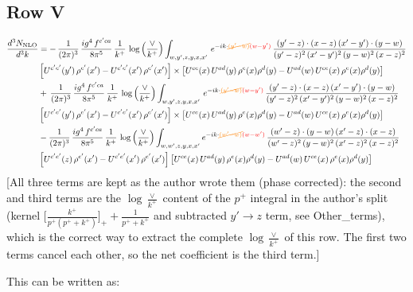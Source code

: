 \documentclass[9pt]{article}
\numberwithin{equation}{section}
\begin{document}
\subsection{Row V}
\begin{align}
    \frac{d^{3}N_{\rm NLO}}{d^{3}k} & =   -\,\frac{1}{(2\pi)^{3}}\, \frac{ig^{4}\,f^{c'ca}}{8\pi^{5}}\, \frac{1}{k^{+}}\,\log{\left(\frac{\vee}{k^{+}}\right)} \int_{w,y',z,y,x,x'}\, e^{-ik\cdot {\color{orange}\cancel{(y'-w)}}{\color{red}(w-y')}}\,\frac{(y'-z)\cdot (x-z)\,(x'-y')\cdot (y-w)}{(y'-z)^{2}\,(x'-y')^{2}\,(y-w)^{2}\,(x-z)^{2}}\notag \\ & \left[U^{c'e'}(y')\,\rho^{e'}(x')-U^{c'e'}(x')\,\rho^{e'}(x')\right]\times  \left[U^{ce}(x)\,U^{ad}(y)\,\rho^{e}(x)\rho^{d}(y)-U^{ad}(w)\,U^{ce}(x)\,\rho^{e}(x)\rho^{d}(y)\right] \notag \\
&   +\,\frac{1}{(2\pi)^{3}}\, \frac{ig^{4}\,f^{c'ca}}{8\pi^{5}}\, \frac{1}{k^{+}}\,\log{\left(\frac{\vee}{k^{+}}\right)} \int_{w,y',z,y,x,x'}\, e^{-ik\cdot {\color{orange}\cancel{(y'-w)}}{\color{red}(w-y')}}\,\frac{(y'-z)\cdot (x-z)\,(x'-y')\cdot (y-w)}{(y'-z)^{2}\,(x'-y')^{2}\,(y-w)^{2}\,(x-z)^{2}}\notag \\ &   \left[U^{c'e'}(y')\,\rho^{e'}(x')-U^{c'e'}(x')\,\rho^{e'}(x')\right]\times  \left[U^{ce}(x)\,U^{ad}(y)\,\rho^{e}(x)\rho^{d}(y)-U^{ad}(w)\,U^{ce}(x)\,\rho^{e}(x)\rho^{d}(y)\right] \notag \\
&   -\frac{1}{(2\pi)^{3}}\, \frac{ig^{4}\,f^{c'ca}}{8\pi^{5}}\, \frac{1}{k^{+}}\,\log{\left(\frac{\vee}{k^{+}}\right)}\int_{w,w',z,y,x,x'} e^{-ik\cdot {\color{orange}\cancel{(w'-w)}}{\color{red}(w-w')}}\,\frac{(w'-z)\cdot (y-w)\,(x'-z)\cdot (x-z)}{(w'-z)^{2}\,(y-w)^{2}\,(x'-z)^{2}\,(x-z)^{2}}\notag \\
&   \left[U^{c'e'}(z)\,\rho^{e'}(x')-U^{c'e'}(x')\,\rho^{e'}(x')\right]\left[U^{ce}(x)\,U^{ad}(y)\,\rho^{e}(x)\rho^{d}(y)-U^{ad}(w)\,U^{ce}(x)\,\rho^{e}(x)\rho^{d}(y)\right]
\end{align} {\color{red}[All three terms are kept as the author wrote them (phase corrected): the second and third terms are the $\log\frac{\vee}{k^{+}}$ content of the $p^{+}$ integral in the author's split (kernel $\big[\frac{k^{+}}{p^{+}(p^{+}+k^{+})}\big]_{+}+\frac{1}{p^{+}+k^{+}}$ and subtracted $y'\to z$ term, see Other\_terms), which is the correct way to extract the complete $\log\frac{\vee}{k^{+}}$ of this row. The first two terms cancel each other, so the net coefficient is the third term.]}\par\noindent
This can be written as:
\end{document}
